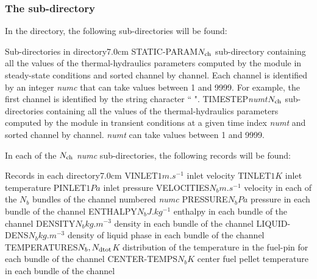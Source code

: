 \subsubsection{The   sub-directory}\label{sect:thmdirhistorydata}
In the  directory, the following sub-directories will be found:
\begin{DescriptionEnregistrement}{Sub-directories
 in  directory}{7.0cm} \label{tabl:tabhistorydatadir}
  \DirlEnr
  {STATIC-PARAM}{$N_{\rm ch}$}
 {sub-directory containing all the values of the thermal-hydraulics parameters computed by the  module in steady-state conditions and sorted channel by channel. Each channel is identified by an integer {\sl numc} that can take values between 1 and 9999. For example, the first channel is identified by the string character `` ".}
   \DirlEnr
 {TIMESTEP{\sl numt}}{$N_{\rm ch}$}
 {sub-directories containing all the values of the thermal-hydraulics parameters computed by the  module in transient conditions at a given time index {\sl numt} and sorted channel by channel. {\sl numt} can take values between 1 and 9999.}
\end{DescriptionEnregistrement}
\noindent
In each of the $N_{\rm ch}$  {\sl numc} sub-directories, the following records will be found:
\begin{DescriptionEnregistrement}{Records
 in each  directory}{7.0cm} \label{tabl:tabchanneldir}
 \RealEnr
 {VINLET}{$1$}{$m.s^{-1}$}
 {inlet velocity}
 \RealEnr
 {TINLET}{$1$}{$K$}
 {inlet temperature}
 \RealEnr
 {PINLET}{$1$}{$Pa$}
 {inlet pressure}
 \RealEnr
 {VELOCITIES}{$N_b$}{$m.s^{-1}$}
 {velocity in each of the $N_b$ bundles of the channel numbered {\sl numc}}
 \RealEnr
 {PRESSURE}{$N_b$}{$Pa$}
 {pressure in each bundle of the channel}
 \RealEnr
 {ENTHALPY}{$N_b$}{$J.kg^{-1}$}
 {enthalpy in each bundle of the channel}
 \RealEnr
 {DENSITY}{$N_b$}{$kg.m^{-3}$}
 {density in each bundle of the channel}
 \RealEnr
 {LIQUID-DENS}{$N_b$}{$kg.m^{-3}$}
 {density of liquid phase in each bundle of the channel}
 \RealEnr
 {TEMPERATURES}{$N_b, N_{\rm dtot}$}{$K$}
 {distribution of the temperature in the fuel-pin for each bundle of the channel}
 \RealEnr
 {CENTER-TEMPS}{$N_b$}{$K$}
 {center fuel pellet temperature in each bundle of the channel}
\end{DescriptionEnregistrement}
